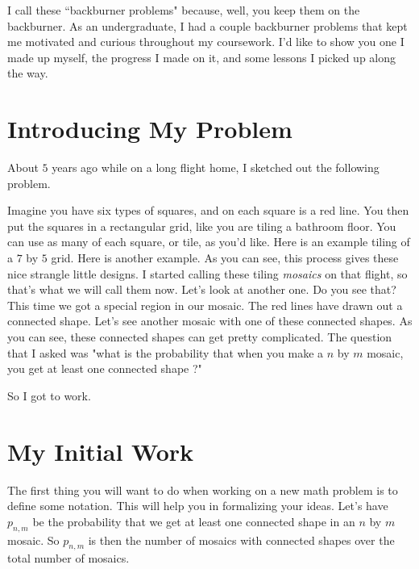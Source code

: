 \documentclass[12pt]{article}
\theoremstyle{plain}
\theoremstyle{definition}
\theoremstyle{remark}
\theoremstyle{definition}
\begin{document}
I call these ``backburner problems" because, well,  you keep them on the backburner. As an undergraduate, I had a couple backburner problems that kept me motivated and curious throughout my coursework. I'd like to show you one I made up myself, the progress I made on it, and some lessons I picked up along the way.

\section{Introducing My Problem}

About $5$ years ago while on a long flight home, I sketched out the following problem.

Imagine you have six types of squares, and on each square is a red line. 
You then put the squares in a rectangular grid, like you are tiling a bathroom floor. You can use as many of each square, or tile, as you'd like. Here is an example tiling of a $7$ by $5$ grid.
Here is another example.
As you can see, this process gives these nice strangle little designs. I started calling these tiling \textit{mosaics} on that flight, so that's what we will call them now. Let's look at another one.
Do you see that? This time we got a special region in our mosaic.  The red lines have drawn out a connected shape. 
Let's see another mosaic with one of these connected shapes.
As you can see, these connected shapes can get pretty complicated.
The question that I asked was "what is the probability that when you make a $n$ by $m$ mosaic, you get at least one connected shape ?" 

So I got to work. 

\section{My Initial Work}

The first thing you will want to do when working on a new math problem is to define some notation. This will help you in formalizing your ideas.
Let's have $p_{n,m}$ be the probability that we get at least one connected shape in an $n$ by $m$ mosaic. So $p_{n,m}$ is then the number of mosaics with connected shapes over the total number of mosaics.
\end{document}
